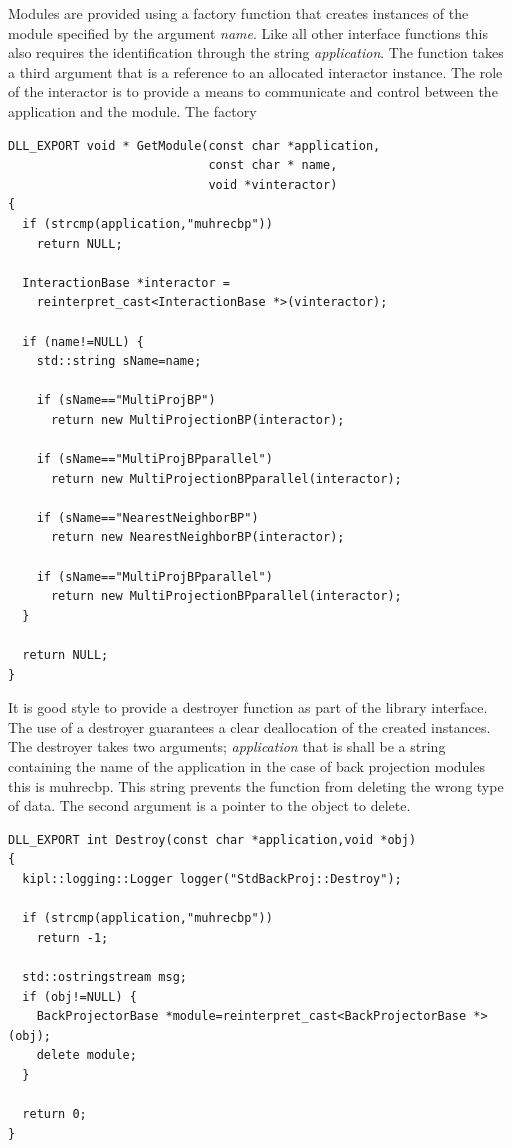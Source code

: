 \documentclass[11pt,a4paper]{article}
\begin{document}
Modules are provided using a factory function that creates instances of the module specified by the argument \emph{name}. Like all other interface functions this also requires the identification through the string \emph{application}. The function takes a third argument that is a reference to an allocated interactor instance. The role of the interactor is to provide a means to communicate and control between the application and the module. The factory 

\begin{lstlisting}
DLL_EXPORT void * GetModule(const char *application, 
                            const char * name, 
                            void *vinteractor)
{
  if (strcmp(application,"muhrecbp"))
    return NULL;

  InteractionBase *interactor = 
    reinterpret_cast<InteractionBase *>(vinteractor);
  
  if (name!=NULL) {
    std::string sName=name;

    if (sName=="MultiProjBP")
      return new MultiProjectionBP(interactor);

    if (sName=="MultiProjBPparallel")
      return new MultiProjectionBPparallel(interactor);

    if (sName=="NearestNeighborBP")
      return new NearestNeighborBP(interactor);
		
    if (sName=="MultiProjBPparallel")
      return new MultiProjectionBPparallel(interactor);
  }

  return NULL;
}
\end{lstlisting}

It is good style to provide a destroyer function as part of the library interface. The use of a destroyer guarantees a clear deallocation of the created instances. The destroyer takes two arguments; \emph{application} that is shall be a string containing the name of the application in the case of back projection modules this is muhrecbp. This string prevents the function from deleting the wrong type of data. The second argument is a pointer to the object to delete. 
\begin{lstlisting}
DLL_EXPORT int Destroy(const char *application,void *obj)
{
  kipl::logging::Logger logger("StdBackProj::Destroy");
  
  if (strcmp(application,"muhrecbp"))
    return -1;

  std::ostringstream msg;
  if (obj!=NULL) {
    BackProjectorBase *module=reinterpret_cast<BackProjectorBase *>(obj);
    delete module;
  }
  
  return 0;
}
\end{lstlisting}
\end{document}
